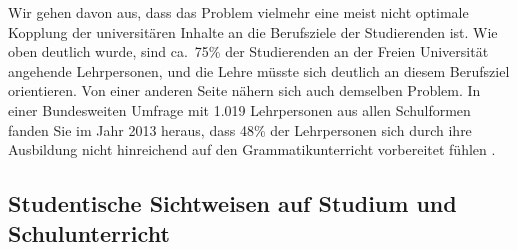 Wir gehen davon aus, dass das Problem vielmehr eine meist nicht optimale Kopplung der universitären Inhalte an die Berufsziele der Studierenden ist.
Wie oben deutlich wurde, sind ca.\ 75\% der Studierenden an der Freien Universität angehende Lehrpersonen, und die Lehre müsste sich deutlich an diesem Berufsziel orientieren.
Von einer anderen Seite nähern sich auch \citet{TopalovicDuenschede2014} demselben Problem.
In einer Bundesweiten Umfrage mit 1.019 Lehrpersonen aus allen Schulformen fanden Sie im Jahr 2013 heraus, dass 48\% der Lehrpersonen sich durch ihre Ausbildung nicht hinreichend auf den Grammatikunterricht vorbereitet fühlen \citep[76--77]{TopalovicDuenschede2014}.


\subsection{Studentische Sichtweisen auf Studium und Schulunterricht}
\label{sec:studentischesichtweisenaufstudiumundschulunterricht}

\begin{figure}[htpb]
  \centering
  \caption{}
  \label{fig:studentischesichtweisenaufstudiumundschulunterricht001}
\end{figure}


